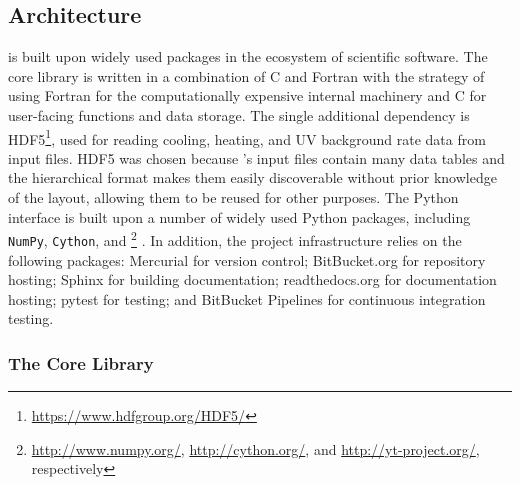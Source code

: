 \subsection{\grackle{} Architecture}

\grackle{} is built upon widely used packages in the ecosystem of
scientific software.
The core
library is written in a combination of C and Fortran with the strategy
of using Fortran for the computationally expensive internal machinery
and C for user-facing functions and data storage.  The single
additional dependency is
HDF5\footnote{\url{https://www.hdfgroup.org/HDF5/}}, used for reading
cooling, heating,
and UV background rate data from input files.  HDF5 was chosen because
\grackle{}'s input files contain many data tables and the hierarchical
format makes them easily discoverable without prior knowledge of the
layout, allowing them to be reused for other purposes.  The Python
interface is built upon a number of widely used Python packages, including
\texttt{NumPy}, \texttt{Cython}, and
\yt{}\footnote{\url{http://www.numpy.org/}, \url{http://cython.org/},
  and \url{http://yt-project.org/}, respectively} \citep[][an SI2-funded
project]{2011ApJS..192....9T}.  In
addition, the project infrastructure relies on the following packages:
Mercurial for version control; BitBucket.org for repository hosting;
Sphinx for building documentation; readthedocs.org for documentation
hosting; pytest for testing; and BitBucket Pipelines for continuous
integration testing.

\subsubsection{The Core Library}
\label{sec:core-library}


